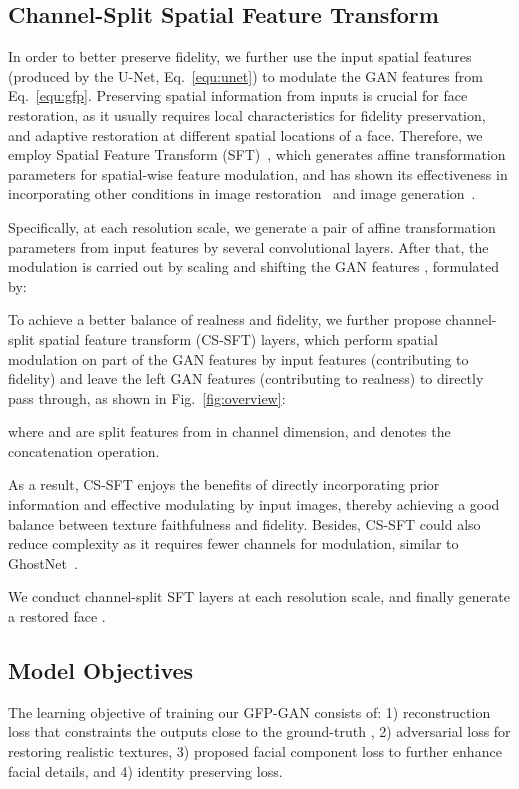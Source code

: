 \documentclass[final]{cvpr}
\begin{document}
\subsection{Channel-Split Spatial Feature Transform}
\label{method:cs-sft}
In order to better preserve fidelity, we further use the input spatial features  (produced by the U-Net, Eq.~\ref{equ:unet}) to modulate the 
GAN features  from Eq.~\ref{equ:gfp}.
Preserving spatial information from inputs is crucial for face restoration, as it usually requires local characteristics for fidelity preservation, and adaptive restoration at different spatial locations of a face.
Therefore, we employ Spatial Feature Transform (SFT)~\cite{wang2018sftgan}, which generates affine transformation parameters for spatial-wise feature modulation, and has shown its effectiveness in incorporating other conditions in image restoration~\cite{wang2018sftgan,li2020dfdnet} and image generation~\cite{park2019spade}.

Specifically, at each resolution scale, we generate a pair of affine transformation parameters  from input features  by several convolutional layers. After that, the modulation is carried out by scaling and shifting the GAN features , formulated by:



To achieve a better balance of realness and fidelity, we further propose channel-split spatial feature transform (CS-SFT) layers, which perform spatial modulation on part of the GAN features by input features  (contributing to fidelity) and leave the left GAN features (contributing to realness) to directly pass through, as shown in Fig.~\ref{fig:overview}:
\vspace{-0.8em}
 
where  and  are split features from  in channel dimension, and  denotes the concatenation operation.

As a result, CS-SFT enjoys the benefits of directly incorporating prior information and effective modulating by input images, thereby achieving a good balance between texture faithfulness and fidelity.
Besides, CS-SFT could also reduce complexity as it requires fewer channels for modulation, similar to GhostNet~\cite{han2020ghostnet}.

We conduct channel-split SFT layers at each resolution scale, and finally generate a restored face .

\subsection{Model Objectives}
\label{method:model_objectives}
The learning objective of training our GFP-GAN consists of: 1) reconstruction loss that constraints the outputs  close to the ground-truth , 2) adversarial loss for restoring realistic textures, 3) proposed facial component loss to further enhance facial details, and 4) identity preserving loss. 
\end{document}
